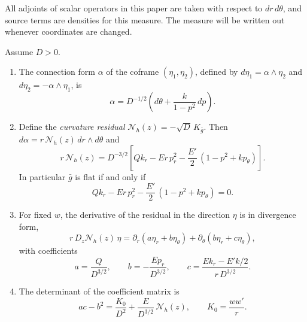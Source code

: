 All adjoints of scalar operators in this paper are taken with respect
to $dr\,d\theta$, and source terms are densities for this measure. The
measure will be written out whenever coordinates are changed.

\begin{proposition}
\label{prop:scalar-core}
Assume $D>0$.
\begin{enumerate}
\item The connection form $\alpha$ of the coframe $(\eta_1,\eta_2)$,
 defined by $d\eta_1=\alpha\wedge\eta_2$ and
 $d\eta_2=-\alpha\wedge\eta_1$, is
 \begin{equation}\label{eq:conn-one-form}
  \alpha=D^{-1/2}\left(d\theta+\frac{k}{1-p^2}\,dp\right).
 \end{equation}
\item Define the \emph{curvature residual}
 $\mathcal N_h(z)=-\sqrt D\,K_{\bar g}$. Then
 $d\alpha=r\,\mathcal N_h(z)\,dr\wedge d\theta$ and
 \begin{equation}\label{eq:cart-curvature-scalar}
  r\,\mathcal N_h(z)=D^{-3/2}
  \left[Qk_r-Er\,p_r^2-\frac{E'}2\,(1-p^2+kp_\theta)\right].
 \end{equation}
 In particular $\bar g$ is flat if and only if
 \begin{equation}\label{eq:darboux-numerator}
  Qk_r-Er\,p_r^2-\frac{E'}2\,(1-p^2+kp_\theta)=0 .
 \end{equation}
\item For fixed $w$, the derivative of the residual in the direction
 $\eta$ is in divergence form,
 \begin{equation}\label{eq:cart-true-derivative}
  r\,D_z\mathcal N_h(z)\,\eta
   =\partial_r(a\eta_r+b\eta_\theta)
       +\partial_\theta(b\eta_r+c\eta_\theta),
 \end{equation}
 with coefficients
 \begin{equation}\label{eq:linear-coefficients}
  a=\frac{Q}{D^{3/2}},\qquad b=-\frac{Ep_r}{D^{3/2}},\qquad
  c=\frac{Ek_r-E'k/2}{r\,D^{3/2}} .
 \end{equation}
\item The determinant of the coefficient matrix is
 \begin{equation}\label{eq:cart-determinant-identity}
  ac-b^2=\frac{K_0}{D^2}+\frac{E}{D^{3/2}}\,\mathcal N_h(z),
  \qquad K_0=\frac{ww'}r .
 \end{equation}
\end{enumerate}
\end{proposition}

